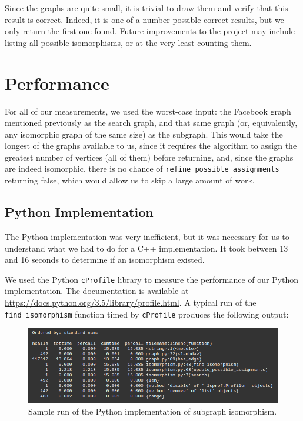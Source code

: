 \documentclass{article}
\begin{document}
  Since the graphs are quite small, it is trivial to draw them and verify that this result is correct. Indeed, it is one of a number possible correct results, but we only return the first one found. Future improvements to the project may include listing all possible isomorphisms, or at the very least counting them.

\section{Performance}

For all of our measurements, we used the worst-case input: the Facebook graph mentioned previously as the search graph, and that same graph (or, equivalently, any isomorphic graph of the same size) as the subgraph. This would take the longest of the graphs available to us, since it requires the algorithm to assign the greatest number of vertices (all of them) before returning, and, since the graphs are indeed isomorphic, there is no chance of \texttt{refine\_possible\_assignments} returning false, which would allow us to skip a large amount of work.

  \subsection{Python Implementation}
  The Python implementation was very inefficient, but it was necessary for us to understand what we had to do for a C++ implementation. It took between 13 and 16 seconds to determine if an isomorphism existed.

  We used the Python \texttt{cProfile} library to measure the performance of our Python implementation. The documentation is available at \url{https://docs.python.org/3.5/library/profile.html}. A typical run of the \texttt{find\_isomorphism} function timed by \texttt{cProfile} produces the following output:

  \begin{figure}[H]
    \centering
    \includegraphics[scale=0.6]{images/perf}
    \caption{Sample run of the Python implementation of subgraph isomorphism.}
  \end{figure}
\end{document}
